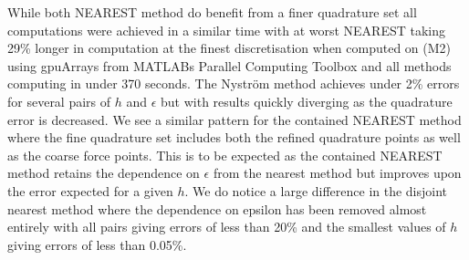 While both NEAREST method do benefit from a finer quadrature set all computations were achieved in a similar time with at worst NEAREST taking 29\% longer in computation at the finest discretisation when computed on (M2) using gpuArrays from MATLABs Parallel Computing Toolbox \cite{Gallagher2020} and all methods computing in under 370 seconds. The Nyström method achieves under 2\% errors for several pairs of $h$ and $\epsilon$ but with results quickly diverging as the quadrature error is decreased. We see a similar pattern for the contained NEAREST method where the fine quadrature set includes both the refined quadrature points as well as the coarse force points. This is to be expected as the contained NEAREST method retains the dependence on $\epsilon$ from the nearest method but improves upon the error expected for a given $h$. We do notice a large difference in the disjoint nearest method where the dependence on epsilon has been removed almost entirely with all pairs giving errors of less than 20\% and the smallest values of $h$ giving errors of less than 0.05\%. 
